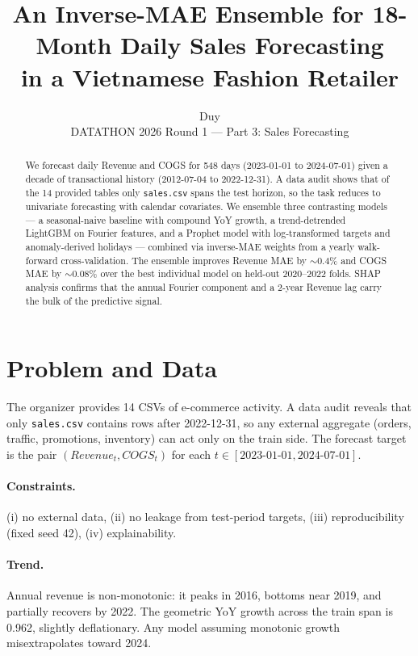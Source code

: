\documentclass{article}
\title{An Inverse-MAE Ensemble for 18-Month Daily Sales Forecasting\\
  in a Vietnamese Fashion Retailer}
\author{%
  Duy \\
  DATATHON 2026 Round 1 --- Part 3: Sales Forecasting
}
\begin{document}
\maketitle

\begin{abstract}
We forecast daily Revenue and COGS for 548 days (2023-01-01 to 2024-07-01)
given a decade of transactional history (2012-07-04 to 2022-12-31). A data
audit shows that of the 14 provided tables only \texttt{sales.csv} spans the
test horizon, so the task reduces to univariate forecasting with calendar
covariates. We ensemble three contrasting models --- a seasonal-naive baseline
with compound YoY growth, a trend-detrended LightGBM on Fourier features, and
a Prophet model with log-transformed targets and anomaly-derived holidays ---
combined via inverse-MAE weights from a yearly walk-forward cross-validation.
The ensemble improves Revenue MAE by $\sim$0.4\% and COGS MAE by $\sim$0.08\%
over the best individual model on held-out 2020--2022 folds. SHAP analysis
confirms that the annual Fourier component and a 2-year Revenue lag carry the
bulk of the predictive signal.
\end{abstract}

\section{Problem and Data}

The organizer provides 14 CSVs of e-commerce activity. A data audit reveals
that only \texttt{sales.csv} contains rows after 2022-12-31, so any external
aggregate (orders, traffic, promotions, inventory) can act only on the train
side. The forecast target is the pair $(Revenue_t, COGS_t)$ for each
$t \in [2023\text{-}01\text{-}01, 2024\text{-}07\text{-}01]$.

\paragraph{Constraints.} (i) no external data, (ii) no leakage from test-period
targets, (iii) reproducibility (fixed seed 42), (iv) explainability.

\paragraph{Trend.} Annual revenue is non-monotonic: it peaks in 2016, bottoms
near 2019, and partially recovers by 2022. The geometric YoY growth across the
train span is 0.962, slightly deflationary. Any model assuming monotonic growth
misextrapolates toward 2024.
\end{document}
